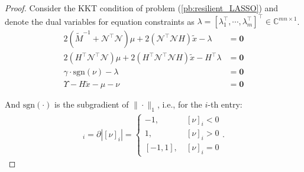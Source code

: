 \documentclass[journal]{IEEEtran}
\newcommand{\Cb}{{\mathbb{C}}}
\newcommand{\Nc}{{\mathcal{N}}}
\newcommand{\sgn}{\text{sgn}}
\newtheorem*{proof}{\textbf{Proof}}
\begin{document}
	\begin{proof}
		Consider the KKT condition of problem (\ref{pb:resilient_LASSO}) and denote the dual variables for equation constraints as $\lambda=[\lambda_1^{\top},\cdots,\lambda_m^{\top}]^{\top}\in \Cb^{mn\times 1}$. 	
		\begin{align}
			2(\tilde{M}^{-1}+\Nc^{\top}\Nc)\mu+2(\Nc^{\top} \Nc H)\tilde{x} - \lambda &= \mathbf{0} \label{eq:KKT1}\\
			2(H^{\top} \Nc^{\top}\Nc)\mu+2(H^{\top} \Nc^{\top} \Nc H)\tilde{x} -  H^{\top}\lambda &= \mathbf{0} \label{eq:KKT2} \\
			\gamma \cdot  \sgn(\nu) - \lambda &= \mathbf{0} \label{eq:KKT3} \\
			\Upsilon - H \tilde{x} - \mu - \nu &= \mathbf{0}  \label{eq:KKT4}
		\end{align}
		
		And $\sgn(\cdot)$ is the subgradient of $\|\cdot\|_1$, i.e., for the $i$-th entry:
		\begin{align*}
			[\sgn(\nu)]_i=\partial |[\nu]_i|=
			\left\{
			\begin{array}{cc}
				-1 ,& \ [\nu]_i<0 \\
				1 , &\ [\nu]_i>0  \\
				\left[-1,1\right],& \ [\nu]_i=0 
			\end{array}
			\right. .
		\end{align*}
		

\end{proof}
\end{document}
